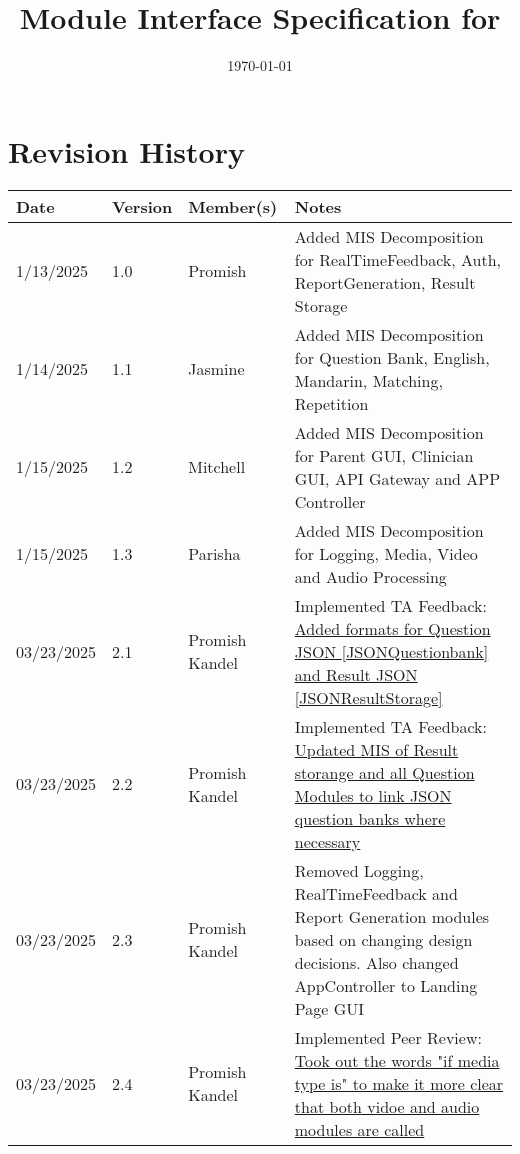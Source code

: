 \documentclass[12pt, titlepage]{article}
\begin{document}
\title{Module Interface Specification for \progname{}}

\author{\authname}

\date{\today}

\maketitle


\section{Revision History}

\begin{tabularx}{\textwidth}{p{3cm}p{2cm}p{3cm}X}
  \toprule {\bf Date} & {\bf Version} & {\bf Member(s)} & {\bf Notes}\\
  \midrule
  1/13/2025 & 1.0 & Promish & Added MIS Decomposition for RealTimeFeedback, Auth, ReportGeneration, Result Storage\\
  1/14/2025 & 1.1 & Jasmine & Added MIS Decomposition for Question Bank, English, Mandarin, Matching, Repetition\\
  1/15/2025 & 1.2 & Mitchell & Added MIS Decomposition for Parent GUI, Clinician GUI, API Gateway and APP Controller\\
  1/15/2025 & 1.3 & Parisha & Added MIS Decomposition for Logging, Media, Video and Audio Processing\\
  03/23/2025 & 2.1 & Promish Kandel & Implemented TA Feedback: \href{https://github.com/parishanizam/TeleHealth/issues/509}{Added formats for Question JSON \ref{JSONQuestionbank} and Result JSON \ref{JSONResultStorage}}\\
  03/23/2025 & 2.2 & Promish Kandel & Implemented TA Feedback: \href{https://github.com/parishanizam/TeleHealth/issues/510}{Updated MIS of Result storange and all Question Modules to link JSON question banks where necessary}\\
  03/23/2025 & 2.3 & Promish Kandel & Removed Logging, RealTimeFeedback and Report Generation modules based on changing design decisions. Also changed AppController to Landing Page GUI \\
  03/23/2025 & 2.4 & Promish Kandel & Implemented Peer Review: \href{https://github.com/parishanizam/TeleHealth/issues/342}{Took out the words "if media type is" to make it more clear that both vidoe and audio modules are called} \\
  \bottomrule
  \end{tabularx}
\end{document}
